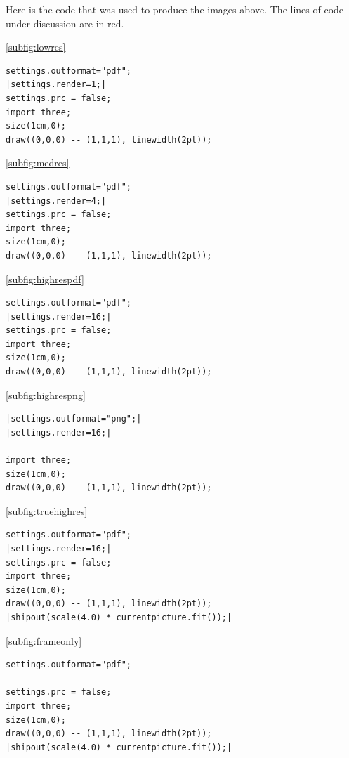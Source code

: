 \documentclass{article}
\begin{document}
\noindent Here is the code that was used to produce the images above.  
The lines of code under discussion are in red.

\def\currentlistingwidth{0.48\linewidth}
\medskip\noindent
\begin{minipage}{\currentlistingwidth}
\ref{subfig:lowres}
\begin{lstlisting}
settings.outformat="pdf";
|settings.render=1;|
settings.prc = false;
import three;
size(1cm,0);
draw((0,0,0) -- (1,1,1), linewidth(2pt));
\end{lstlisting}
\end{minipage}
\hfill
\begin{minipage}{\currentlistingwidth}
\ref{subfig:medres}
\begin{lstlisting}
settings.outformat="pdf";
|settings.render=4;|
settings.prc = false;
import three;
size(1cm,0);
draw((0,0,0) -- (1,1,1), linewidth(2pt));
\end{lstlisting}
\end{minipage}
\begin{minipage}{\currentlistingwidth}
\ref{subfig:highrespdf}
\begin{lstlisting}
settings.outformat="pdf";
|settings.render=16;|
settings.prc = false;
import three;
size(1cm,0);
draw((0,0,0) -- (1,1,1), linewidth(2pt));
\end{lstlisting}
\end{minipage}
\hfill
\begin{minipage}{\currentlistingwidth}
\ref{subfig:highrespng}
\begin{lstlisting}
|settings.outformat="png";|
|settings.render=16;|

import three;
size(1cm,0);
draw((0,0,0) -- (1,1,1), linewidth(2pt));
\end{lstlisting}
\end{minipage}
\begin{minipage}{\currentlistingwidth}
\ref{subfig:truehighres}
\begin{lstlisting}
settings.outformat="pdf";
|settings.render=16;|
settings.prc = false;
import three;
size(1cm,0);
draw((0,0,0) -- (1,1,1), linewidth(2pt));
|shipout(scale(4.0) * currentpicture.fit());|
\end{lstlisting}
\end{minipage}
\hfill
\begin{minipage}{\currentlistingwidth}
\ref{subfig:frameonly}
\begin{lstlisting}
settings.outformat="pdf";

settings.prc = false;
import three;
size(1cm,0);
draw((0,0,0) -- (1,1,1), linewidth(2pt));
|shipout(scale(4.0) * currentpicture.fit());|
\end{lstlisting}
\end{minipage}
\end{document}
